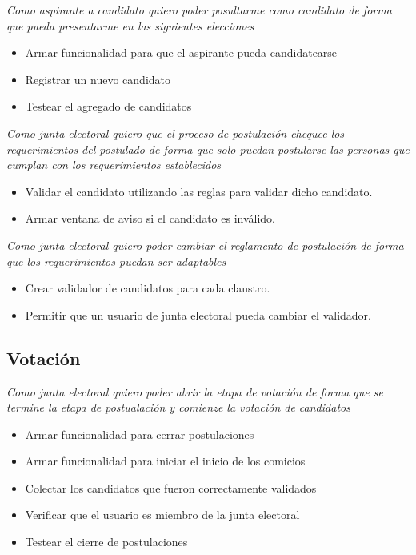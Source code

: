 \medskip

\textsl{Como aspirante a candidato quiero poder posultarme como candidato de forma que pueda presentarme en las siguientes elecciones}
\begin{itemize}
 \item Armar funcionalidad para que el aspirante pueda candidatearse
 \item Registrar un nuevo candidato
 \item Testear el agregado de candidatos
\end{itemize}

\medskip

\textsl{Como junta electoral quiero que el proceso de postulaci\'on chequee los requerimientos del postulado de forma que solo puedan postularse las personas que cumplan con los requerimientos establecidos}
\begin{itemize}
 \item Validar el candidato utilizando las reglas para validar dicho candidato.
 \item Armar ventana de aviso si el candidato es inv\'alido.
\end{itemize}

\medskip
\textsl{Como junta electoral quiero poder cambiar el reglamento de postulaci\'on de forma que los requerimientos puedan ser adaptables}
\begin{itemize}
 \item Crear validador de candidatos para cada claustro.
 \item Permitir que un usuario de junta electoral pueda cambiar el validador.
\end{itemize}

\bigskip

\subsection*{Votaci\'on}

\textsl{Como junta electoral quiero poder abrir la etapa de votaci\'on de forma que se termine la etapa de postualaci\'on y comienze la votaci\'on de candidatos}
\begin{itemize}
 \item Armar funcionalidad para cerrar postulaciones
 \item Armar funcionalidad para iniciar el inicio de los comicios
 \item Colectar los candidatos que fueron correctamente validados 
 \item Verificar que el usuario es miembro de la junta electoral
 \item Testear el cierre de postulaciones
\end{itemize}

